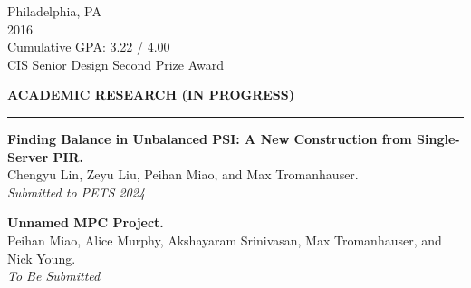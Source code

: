 \documentclass{resume} %
\begin{document}
\vspace{5mm}
\hspace*{1mm}{\bf University of Pennsylvania} \hfill Philadelphia, PA \\
\hspace*{1mm}{\em Bachelor of Science in Engineering in Computer Science} \hfill 2016 \\
\hspace*{1mm}Cumulative GPA: 3.22 / 4.00 \\
\hspace*{1mm}CIS Senior Design Second Prize Award

\iffalse
\hspace*{1mm}{\em Relevant Courses:} Advanced Topics in Algorithms and Complexity \\
\hspace*{2mm}Internet \& Web Systems, Computer Operating Systems, Introduction to Artificial Intelligence

\hspace*{1mm} {\bf Belmont High School} \hfill Belmont, MA \\
\hspace*{1mm} Graduate \hfill June 2012 \\
\hspace*{1mm} Cumulative GPA: 3.84 / 4.00
\fi


\medskip
\MakeUppercase{{\bf Academic Research \hfill (In Progress)}}
\medskip
\hrule
\hspace*{1mm} {\bf Finding Balance in Unbalanced PSI: A New Construction from Single-Server PIR.} \\
\hspace*{1mm} Chengyu Lin, Zeyu Liu, Peihan Miao, and Max Tromanhauser. \\
\hspace*{1mm} {\em Submitted to PETS 2024}

\hspace*{1mm} {\bf \color{blue} Unnamed MPC Project.} \\
\hspace*{1mm} Peihan Miao, Alice Murphy, Akshayaram Srinivasan, Max Tromanhauser, and Nick Young. \\
\hspace*{1mm} {\em To Be Submitted} %
\end{document}
